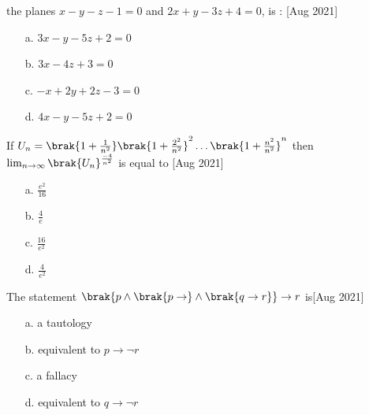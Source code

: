 the planes $x - y - z - 1 = 0$ and $2x + y - 3z + 4 = 0$,
is : \hfill  [Aug 2021]
\begin{enumerate}
     \item [a.] $3x-y-5z+2=0$
    \item [b.] $3x-4z+3=0$
    \item [c.] $-x+2y+2z-3=0$
    \item [d.] $4x-y-5z+2=0$
\end{enumerate}
\item If $U_n = \brak{1+\frac{1}{n^2}}\brak{1+\frac{2^2}{n^2}}^2\ldots\brak{1+\frac{n^2}{n^2}}^n$ then $\lim_{n\rightarrow\infty}\brak{U_n}^{\frac{-4}{n^2}}$ is equal to \hfill  [Aug 2021]
\begin{enumerate}
     \item [a.] $\frac{e^2}{16}$
    \item [b.] $\frac{4}{e}$
    \item [c.] $\frac{16}{e^2}$
    \item [d.] $\frac{4}{e^2}$
\end{enumerate}
\item The statement $\brak{p\land\brak{p\rightarrow}\land\brak{q\rightarrow r}}\rightarrow r$ is\hfill  [Aug 2021]
\begin{enumerate}
     \item [a.] a tautology
    \item [b.] equivalent to $p\rightarrow\neg r$
    \item [c.] a fallacy
    \item [d.] equivalent to $q\rightarrow\neg r$
\end{enumerate}

